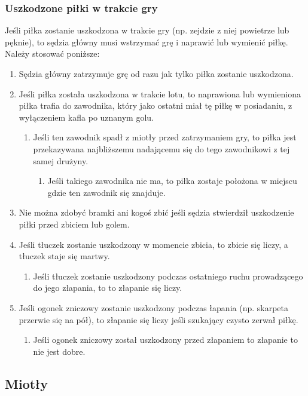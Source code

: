 \documentclass[11pt,a4paper]{article}
\begin{document}
\subsubsection{Uszkodzone piłki w trakcie gry}
Jeśli piłka zostanie uszkodzona w trakcie gry (np. zejdzie z niej powietrze lub pęknie), to sędzia główny musi wstrzymać grę i naprawić lub wymienić piłkę. Należy stosować poniższe:
\begin{enumerate}
  \item Sędzia główny zatrzymuje grę od razu jak tylko piłka zostanie uszkodzona.
  \item Jeśli piłka została uszkodzona w trakcie lotu, to naprawiona lub wymieniona piłka trafia do zawodnika, który jako ostatni miał tę piłkę w posiadaniu, z wyłączeniem kafla po uznanym golu.
  \begin{enumerate}
    \item Jeśli ten zawodnik spadł z miotły przed zatrzymaniem gry, to piłka jest przekazywana najbliższemu nadającemu się do tego zawodnikowi z tej samej drużyny.
    \begin{enumerate}
      \item Jeśli takiego zawodnika nie ma, to piłka zostaje położona w miejscu gdzie ten zawodnik się znajduje.
    \end{enumerate}
  \end{enumerate}
  \item Nie można zdobyć bramki ani kogoś zbić jeśli sędzia stwierdził uszkodzenie piłki przed zbiciem lub golem.
  \item Jeśli tłuczek zostanie uszkodzony w momencie zbicia, to zbicie się liczy, a tłuczek staje się martwy.
  \begin{enumerate}
    \item Jeśli tłuczek zostanie uszkodzony podczas ostatniego ruchu prowadzącego do jego złapania, to to złapanie się liczy.
  \end{enumerate}
  \item Jeśli ogonek zniczowy zostanie uszkodzony podczas łapania (np. skarpeta przerwie się na pół), to złapanie się liczy jeśli szukający czysto zerwał piłkę.
  \begin{enumerate}
    \item Jeśli ogonek zniczowy został uszkodzony przed złapaniem to złapanie to nie jest dobre.
  \end{enumerate}
\end{enumerate}

\subsection{Miotły}
\end{document}
